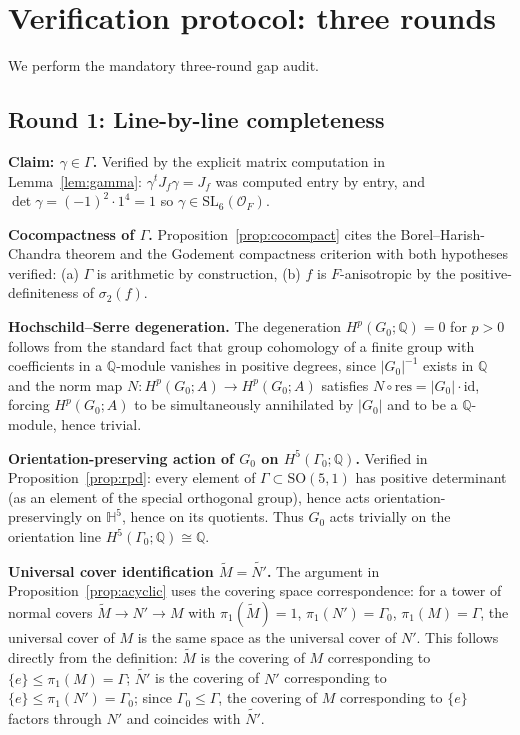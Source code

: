 \documentclass[12pt]{article}
\theoremstyle{definition}
\theoremstyle{remark}
\begin{document}
\section{Verification protocol: three rounds}
\label{sec:rounds}

We perform the mandatory three-round gap audit.

\subsection*{Round 1: Line-by-line completeness}

\noindent\textbf{Claim: $\gamma \in \Gamma$.} Verified by the explicit matrix computation
in Lemma~\ref{lem:gamma}: $\gamma^t J_f \gamma = J_f$ was computed entry by entry, and
$\det\gamma = (-1)^2 \cdot 1^4 = 1$ so $\gamma \in \mathrm{SL}_6(\mathcal{O}_F)$.

\noindent\textbf{Cocompactness of $\Gamma$.}
Proposition~\ref{prop:cocompact} cites the Borel--Harish-Chandra theorem and the
Godement compactness criterion with both hypotheses verified:
(a) $\Gamma$ is arithmetic by construction, (b) $f$ is $F$-anisotropic by the
positive-definiteness of $\sigma_2(f)$.

\noindent\textbf{Hochschild--Serre degeneration.}
The degeneration $H^p(G_0;\mathbb{Q}) = 0$ for $p > 0$ follows from the standard fact
that group cohomology of a finite group with coefficients in a $\mathbb{Q}$-module vanishes
in positive degrees, since $|G_0|^{-1}$ exists in $\mathbb{Q}$ and the norm map
$N: H^p(G_0;A) \to H^p(G_0;A)$ satisfies $N \circ \text{res} = |G_0| \cdot \mathrm{id}$,
forcing $H^p(G_0;A)$ to be simultaneously annihilated by $|G_0|$ and to be a
$\mathbb{Q}$-module, hence trivial.

\noindent\textbf{Orientation-preserving action of $G_0$ on $H^5(\Gamma_0;\mathbb{Q})$.}
Verified in Proposition~\ref{prop:rpd}: every element of $\Gamma \subset \mathrm{SO}(5,1)$
has positive determinant (as an element of the special orthogonal group), hence acts
orientation-preservingly on $\mathbb{H}^5$, hence on its quotients. Thus $G_0$ acts
trivially on the orientation line $H^5(\Gamma_0;\mathbb{Q}) \cong \mathbb{Q}$.

\noindent\textbf{Universal cover identification $\widetilde{M} = \widetilde{N'}$.}
The argument in Proposition~\ref{prop:acyclic} uses the covering space correspondence:
for a tower of normal covers $\widetilde{M} \to N' \to M$ with
$\pi_1(\widetilde{M}) = 1$, $\pi_1(N') = \Gamma_0$, $\pi_1(M) = \Gamma$, the universal
cover of $M$ is the same space as the universal cover of $N'$. This follows directly from
the definition: $\widetilde{M}$ is the covering of $M$ corresponding to
$\{e\} \leq \pi_1(M) = \Gamma$; $\widetilde{N'}$ is the covering of $N'$ corresponding
to $\{e\} \leq \pi_1(N') = \Gamma_0$; since $\Gamma_0 \leq \Gamma$, the covering of
$M$ corresponding to $\{e\}$ factors through $N'$ and coincides with $\widetilde{N'}$.
\end{document}
